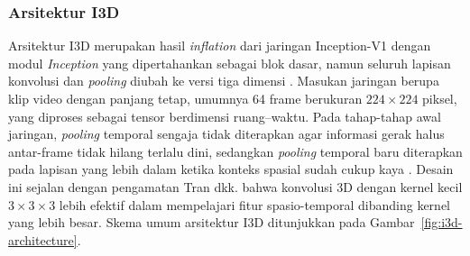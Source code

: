 \subsubsection{Arsitektur I3D} \label{II.I3D.2}
Arsitektur I3D merupakan hasil \textit{inflation} dari jaringan Inception-V1 dengan modul \textit{Inception} yang dipertahankan sebagai blok dasar, namun seluruh lapisan konvolusi dan \textit{pooling} diubah ke versi tiga dimensi \cite{Carreira2017I3D}. Masukan jaringan berupa klip video dengan panjang tetap, umumnya 64 frame berukuran $224 \times 224$ piksel, yang diproses sebagai tensor berdimensi ruang--waktu. Pada tahap-tahap awal jaringan, \textit{pooling} temporal sengaja tidak diterapkan agar informasi gerak halus antar-frame tidak hilang terlalu dini, sedangkan \textit{pooling} temporal baru diterapkan pada lapisan yang lebih dalam ketika konteks spasial sudah cukup kaya \cite{Carreira2017I3D}. Desain ini sejalan dengan pengamatan Tran dkk. \cite{Tran2015} bahwa konvolusi 3D dengan kernel kecil $3 \times 3 \times 3$ lebih efektif dalam mempelajari fitur spasio-temporal dibanding kernel yang lebih besar. Skema umum arsitektur I3D ditunjukkan pada Gambar~\ref{fig:i3d-architecture}.\par

